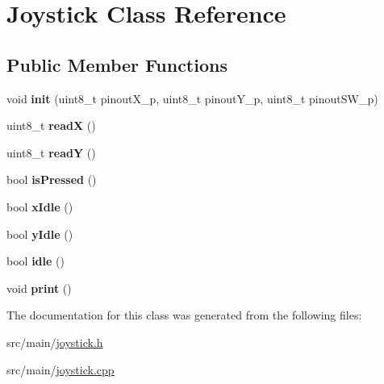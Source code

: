 \hypertarget{class_joystick}{}\section{Joystick Class Reference}
\label{class_joystick}
\subsection*{Public Member Functions}
\begin{DoxyCompactItemize}
\item 
\mbox{\label{class_joystick_add56a0e9f92176c9f12e3f12e3983588}} 
void {\bfseries init} (uint8\+\_\+t pinout\+X\+\_\+p, uint8\+\_\+t pinout\+Y\+\_\+p, uint8\+\_\+t pinout\+S\+W\+\_\+p)
\item 
\mbox{\label{class_joystick_a8397707b6987a6621e94fe9d071f8da0}} 
uint8\+\_\+t {\bfseries readX} ()
\item 
\mbox{\label{class_joystick_a9d884490b52300eb2081701a53e32c97}} 
uint8\+\_\+t {\bfseries readY} ()
\item 
\mbox{\label{class_joystick_a67821faa398aede9f7303ee69e2e1348}} 
bool {\bfseries is\+Pressed} ()
\item 
\mbox{\label{class_joystick_a12b4e2601b66e1607c77c52364e96adc}} 
bool {\bfseries x\+Idle} ()
\item 
\mbox{\label{class_joystick_a02261229db91dab161af9744cc6ff81d}} 
bool {\bfseries y\+Idle} ()
\item 
\mbox{\label{class_joystick_a5a2f4443f0b0e44f328bea0137e023dd}} 
bool {\bfseries idle} ()
\item 
\mbox{\label{class_joystick_afd789cfd5832facccafa3784c8016b16}} 
void {\bfseries print} ()
\end{DoxyCompactItemize}


The documentation for this class was generated from the following files\+:\begin{DoxyCompactItemize}
\item 
src/main/\hyperlink{joystick_8h}{joystick.\+h}\item 
src/main/\hyperlink{joystick_8cpp}{joystick.\+cpp}\end{DoxyCompactItemize}
